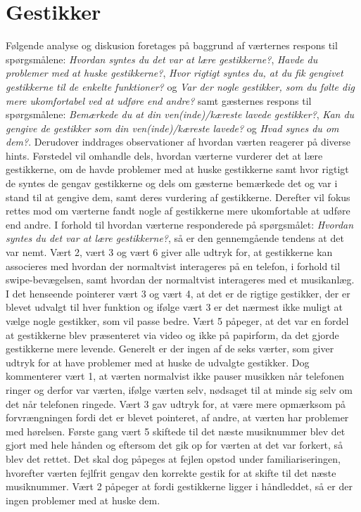 \section{Gestikker}
\label{TestresultaterSocialAcceptGestikker}
%
Følgende analyse og diskusion foretages på baggrund af værternes respons til spørgsmålene: \textit{Hvordan syntes du det var at lære gestikkerne?}, \textit{Havde du problemer med at huske gestikkerne?}, \textit{Hvor rigtigt syntes du, at du fik gengivet gestikkerne til de enkelte funktioner?} og \textit{Var der nogle gestikker, som du følte dig mere ukomfortabel ved at udføre end andre?} samt gæsternes respons til spørgsmålene: \textit{Bemærkede du at din ven(inde)/kæreste lavede gestikker?}, \textit{Kan du gengive de gestikker som din ven(inde)/kæreste lavede?} og \textit{Hvad synes du om dem?}. Derudover inddrages observationer af hvordan værten reagerer på diverse hints. Førstedel vil omhandle dels, hvordan værterne vurderer det at lære gestikkerne, om de havde problemer med at huske gestikkerne samt hvor rigtigt de syntes de gengav gestikkerne og dels om gæsterne bemærkede det og var i stand til at gengive dem, samt deres vurdering af gestikkerne. Derefter vil fokus rettes mod om værterne fandt nogle af gestikkerne mere ukomfortable at udføre end andre.\blankline
%
I forhold til hvordan værterne responderede på spørgsmålet: \textit{Hvordan syntes du det var at lære gestikkerne?}, så er den gennemgående tendens at det var nemt. Vært 2, vært 3 og vært 6 giver alle udtryk for, at gestikkerne kan associeres med hvordan der normaltvist interageres på en telefon, i forhold til swipe-bevægelsen, samt hvordan der normaltvist interageres med et musikanlæg. I det henseende pointerer vært 3 og vært 4, at det er de rigtige gestikker, der er blevet udvalgt til hver funktion og ifølge vært 3 er det nærmest ikke muligt at vælge nogle gestikker, som vil passe bedre. Vært 5 påpeger, at det var en fordel at gestikkerne blev præsenteret via video og ikke på papirform, da det gjorde gestikkerne mere levende. Generelt er der ingen af de seks værter, som giver udtryk for at have problemer med at huske de udvalgte gestikker. Dog kommenterer vært 1, at værten normalvist ikke pauser musikken når telefonen ringer og derfor var værten, ifølge værten selv, nødsaget til at minde sig selv om det når telefonen ringede. Vært 3 gav udtryk for, at være mere opmærksom på forvrængningen fordi det er blevet pointeret, af andre, at værten har problemer med hørelsen. Første gang vært 5 skiftede til det næste musiknummer blev det gjort med hele hånden og eftersom det gik op for værten at det var forkert, så blev det rettet. Det skal dog påpeges at fejlen opstod under familiariseringen, hvorefter værten fejlfrit gengav den korrekte gestik for at skifte til det næste musiknummer. Vært 2 påpeger at fordi gestikkerne ligger i håndleddet, så er der ingen problemer med at huske dem. 

